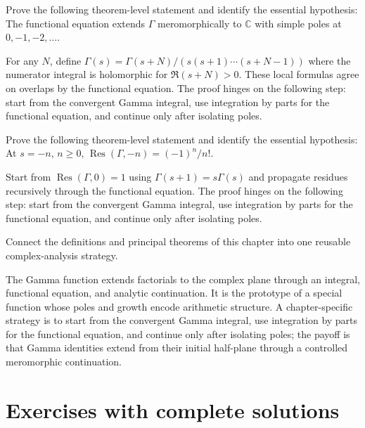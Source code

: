 \begin{problem}\label{prob:iv19-problem-10}
Prove the following theorem-level statement and identify the essential hypothesis: The functional equation extends $\Gamma$ meromorphically to $\mathbb C$ with simple poles at $0,-1,-2,\dots$.
\end{problem}
\begin{solution}
For any $N$, define $\Gamma(s)=\Gamma(s+N)/(s(s+1)\cdots(s+N-1))$ where the numerator integral is holomorphic for $\Re(s+N)>0$. These local formulas agree on overlaps by the functional equation. The proof hinges on the following step: start from the convergent Gamma integral, use integration by parts for the functional equation, and continue only after isolating poles.
\end{solution}

\begin{problem}\label{prob:iv19-problem-11}
Prove the following theorem-level statement and identify the essential hypothesis: At $s=-n$, $n\ge0$, $\operatorname{Res}(\Gamma,-n)=(-1)^n/n!$.
\end{problem}
\begin{solution}
Start from $\operatorname{Res}(\Gamma,0)=1$ using $\Gamma(s+1)=s\Gamma(s)$ and propagate residues recursively through the functional equation. The proof hinges on the following step: start from the convergent Gamma integral, use integration by parts for the functional equation, and continue only after isolating poles.
\end{solution}

\begin{problem}\label{prob:iv19-problem-12}
Connect the definitions and principal theorems of this chapter into one reusable complex-analysis strategy.
\end{problem}
\begin{solution}
The Gamma function extends factorials to the complex plane through an integral, functional equation, and analytic continuation. It is the prototype of a special function whose poles and growth encode arithmetic structure. A chapter-specific strategy is to start from the convergent Gamma integral, use integration by parts for the functional equation, and continue only after isolating poles; the payoff is that Gamma identities extend from their initial half-plane through a controlled meromorphic continuation.
\end{solution}

\section{Exercises with complete solutions}

